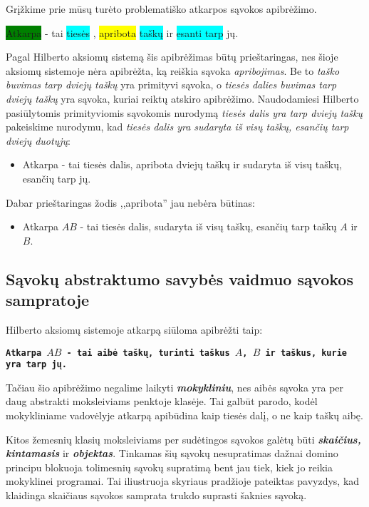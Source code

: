 \documentclass{article}
\begin{document}
Grįžkime prie mūsų turėto problematiško atkarpos sąvokos apibrėžimo.

\colorbox{green}{Atkarpa} - tai \colorbox{cyan}{tiesės} , \colorbox{yellow}{apribota}  \colorbox{cyan}{taškų} ir \colorbox{cyan}{esanti tarp} jų.

Pagal Hilberto aksiomų sistemą šis apibrėžimas būtų prieštaringas, nes šioje aksiomų sistemoje nėra apibrėžta, ką reiškia sąvoka \textit{apribojimas}. Be to \textit{taško buvimas tarp dviejų taškų} yra primityvi sąvoka, o \textit{tiesės dalies buvimas tarp dviejų taškų} yra sąvoka, kuriai reiktų atskiro apibrėžimo. Naudodamiesi Hilberto pasiūlytomis primityviomis sąvokomis nurodymą \textit{tiesės dalis yra tarp dviejų taškų} pakeiskime nurodymu, kad \textit{tiesės dalis yra sudaryta iš visų taškų, esančių tarp dviejų duotųjų}:

\begin{itemize}
\item Atkarpa - tai tiesės dalis, apribota dviejų taškų ir sudaryta iš visų taškų, esančių tarp jų.
\end{itemize}

Dabar prieštaringas žodis ,,apribota'' jau nebėra būtinas:

\begin{itemize}
\item Atkarpa $AB$ - tai tiesės dalis, sudaryta iš visų taškų, esančių tarp taškų $A$ ir $B$.
\end{itemize}

\subsection{Sąvokų abstraktumo savybės vaidmuo sąvokos sampratoje}
Hilberto aksiomų sistemoje atkarpą siūloma apibrėžti taip:

\texttt{\textbf{Atkarpa $AB$ - tai aibė taškų, turinti taškus $A$, $B$ ir taškus, kurie yra tarp jų.}}

Tačiau šio apibrėžimo negalime laikyti \textit{\textbf{mokykliniu}}, nes aibės sąvoka yra per daug abstrakti moksleiviams penktoje klasėje. Tai galbūt parodo, kodėl mokykliniame vadovėlyje atkarpą apibūdina kaip tiesės dalį, o ne kaip taškų aibę.

Kitos žemesnių klasių moksleiviams per sudėtingos sąvokos galėtų būti \textbf{\textit{skaičius, kintamasis}} ir \textbf{\textit{objektas}}. Tinkamas šių sąvokų nesupratimas dažnai domino principu blokuoja tolimesnių sąvokų supratimą bent jau tiek, kiek jo reikia mokyklinei programai. Tai iliustruoja skyriaus pradžioje pateiktas pavyzdys, kad klaidinga skaičiaus sąvokos samprata trukdo suprasti šaknies sąvoką. 
\end{document}
